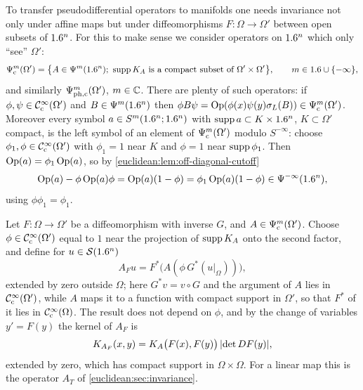 To transfer pseudodifferential operators to manifolds one needs invariance
not only under affine maps but under diffeomorphisms $F:\Omega\to\Omega'$
between open subsets of $1.6^n$. For this to make sense we consider operators
on $1.6^n$ which only ``see'' $\Omega'$:
\begin{equation*}
  \Psi^{m}_{\mathrm c}(\Omega')=\bigl\{A\in\Psi^{m}(1.6^n);\ \operatorname{supp} K_A
  \text{ is a compact subset of }\Omega'\times\Omega'\bigr\},\qquad m\in1.6\cup\{-\infty\},
\end{equation*}
and similarly $\Psi^{m}_{\mathrm{ph,c}}(\Omega')$, $m\in\mathbb{C}$. There are plenty
of such operators: if $\phi,\psi\in\mathcal{C}^\infty_{\mathrm{c}}(\Omega')$ and $B\in\Psi^{m}(1.6^n)$
then $\phi B\psi=\operatorname{Op}(\phi(x)\psi(y)\sigma_L(B))\in\Psi^{m}_{\mathrm c}(\Omega')$.
Moreover every symbol $a\in S^m(1.6^n;1.6^n)$ with $\operatorname{supp} a\subset K\times1.6^n$,
$K\subset\Omega'$ compact, is the left symbol of an element of
$\Psi^{m}_{\mathrm c}(\Omega')$ modulo $S^{-\infty}$: choose
$\phi_1,\phi\in\mathcal{C}^\infty_{\mathrm{c}}(\Omega')$ with $\phi_1=1$ near $K$ and $\phi=1$ near
$\operatorname{supp}\phi_1$. Then $\operatorname{Op}(a)=\phi_1\operatorname{Op}(a)$, so by
\cref{euclidean:lem:off-diagonal-cutoff}
\begin{equation*}
  \operatorname{Op}(a)-\phi\operatorname{Op}(a)\phi=\operatorname{Op}(a)(1-\phi)=\phi_1\operatorname{Op}(a)(1-\phi)\in\Psi^{-\infty}(1.6^n),
\end{equation*}
using $\phi\phi_1=\phi_1$.

Let $F:\Omega\to\Omega'$ be a diffeomorphism with inverse $G$, and
$A\in\Psi^{m}_{\mathrm c}(\Omega')$. Choose $\phi\in\mathcal{C}^\infty_{\mathrm{c}}(\Omega')$ equal to
$1$ near the projection of $\operatorname{supp} K_A$ onto the second factor, and define
for $u\in\mathcal{S}(1.6^n)$
\begin{equation*}
  A_Fu=F^*\bigl(A(\phi\,G^*(u|_\Omega))\bigr),
\end{equation*}
extended by zero outside $\Omega$; here $G^*v=v\circ G$ and the argument of
$A$ lies in $\mathcal{C}^\infty_{\mathrm{c}}(\Omega')$, while $A$ maps it to a function with compact
support in $\Omega'$, so that $F^*$ of it lies in $\mathcal{C}^\infty_{\mathrm{c}}(\Omega)$. The result does not depend on $\phi$,
and by the change of variables $y'=F(y)$ the kernel of $A_F$ is
\begin{equation*}
  K_{A_F}(x,y)=K_A\bigl(F(x),F(y)\bigr)\,\lvert \det DF(y)\rvert,
\end{equation*}
extended by zero, which has compact support in $\Omega\times\Omega$. For a
linear map this is the operator $A_T$ of \cref{euclidean:sec:invariance}.

